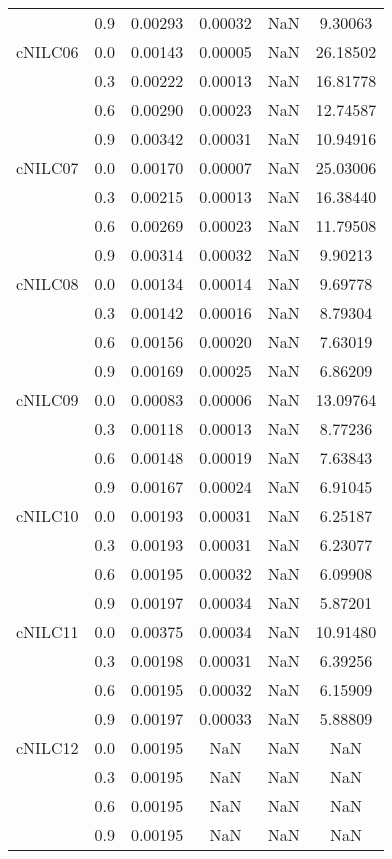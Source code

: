 \begin{longtable}{cccccc}
        & 0.9 & 0.00293 & 0.00032 & NaN & 9.30063 \\
cNILC06 & 0.0 & 0.00143 & 0.00005 & NaN & 26.18502 \\
        & 0.3 & 0.00222 & 0.00013 & NaN & 16.81778 \\
        & 0.6 & 0.00290 & 0.00023 & NaN & 12.74587 \\
        & 0.9 & 0.00342 & 0.00031 & NaN & 10.94916 \\
cNILC07 & 0.0 & 0.00170 & 0.00007 & NaN & 25.03006 \\
        & 0.3 & 0.00215 & 0.00013 & NaN & 16.38440 \\
        & 0.6 & 0.00269 & 0.00023 & NaN & 11.79508 \\
        & 0.9 & 0.00314 & 0.00032 & NaN & 9.90213 \\
cNILC08 & 0.0 & 0.00134 & 0.00014 & NaN & 9.69778 \\
        & 0.3 & 0.00142 & 0.00016 & NaN & 8.79304 \\
        & 0.6 & 0.00156 & 0.00020 & NaN & 7.63019 \\
        & 0.9 & 0.00169 & 0.00025 & NaN & 6.86209 \\
cNILC09 & 0.0 & 0.00083 & 0.00006 & NaN & 13.09764 \\
        & 0.3 & 0.00118 & 0.00013 & NaN & 8.77236 \\
        & 0.6 & 0.00148 & 0.00019 & NaN & 7.63843 \\
        & 0.9 & 0.00167 & 0.00024 & NaN & 6.91045 \\
cNILC10 & 0.0 & 0.00193 & 0.00031 & NaN & 6.25187 \\
        & 0.3 & 0.00193 & 0.00031 & NaN & 6.23077 \\
        & 0.6 & 0.00195 & 0.00032 & NaN & 6.09908 \\
        & 0.9 & 0.00197 & 0.00034 & NaN & 5.87201 \\
cNILC11 & 0.0 & 0.00375 & 0.00034 & NaN & 10.91480 \\
        & 0.3 & 0.00198 & 0.00031 & NaN & 6.39256 \\
        & 0.6 & 0.00195 & 0.00032 & NaN & 6.15909 \\
        & 0.9 & 0.00197 & 0.00033 & NaN & 5.88809 \\
cNILC12 & 0.0 & 0.00195 & NaN & NaN & NaN \\
        & 0.3 & 0.00195 & NaN & NaN & NaN \\
        & 0.6 & 0.00195 & NaN & NaN & NaN \\
        & 0.9 & 0.00195 & NaN & NaN & NaN \\

\end{longtable}
